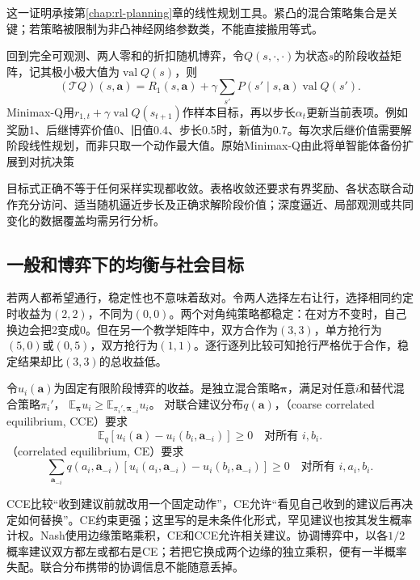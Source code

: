 这一证明承接第\ref{chap:rl-planning}章的线性规划工具。紧凸的混合策略集合是关键；若策略被限制为非凸神经网络参数类，不能直接搬用等式。

回到完全可观测、两人零和的折扣随机博弈，令$Q(s,\cdot,\cdot)$为状态$s$的阶段收益矩阵，记其极小极大值为$\operatorname{val}Q(s)$，则
\begin{equation}
 (\mathcal T Q)(s,\bm a)
 =R_1(s,\bm a)+\gamma\sum_{s'}P(s'\mid s,\bm a)
           \operatorname{val}Q(s').
 \label{eq:rl-multi-agent-minimax-backup}
\end{equation}
Minimax-Q用$r_{1,t}+\gamma\operatorname{val}Q(s_{t+1})$作样本目标，再以步长$\alpha_t$更新当前表项。例如奖励1、后继博弈价值0、旧值0.4、步长0.5时，新值为0.7。每次求后继价值需要解阶段线性规划，而非只取一个动作最大值。原始Minimax-Q由此将单智能体备份扩展到对抗决策

目标式正确不等于任何采样实现都收敛。表格收敛还要求有界奖励、各状态联合动作充分访问、适当随机逼近步长及正确求解阶段价值；深度逼近、局部观测或共同变化的数据覆盖均需另行分析。

\subsection{一般和博弈下的均衡与社会目标}
\label{sec:rl-multi-agent-equilibria}

若两人都希望通行，稳定性也不意味着敌对。令两人选择左右让行，选择相同约定时收益为$(2,2)$，不同为$(0,0)$。两个对角纯策略都稳定：在对方不变时，自己换边会把2变成0。但在另一个教学矩阵中，双方合作为$(3,3)$，单方抢行为$(5,0)$或$(0,5)$，双方抢行为$(1,1)$。逐行逐列比较可知抢行严格优于合作，稳定结果却比$(3,3)$的总收益低。

\begin{definition}[有限阶段博弈的偏离标准]
\label{def:rl-multi-agent-equilibria}
令$u_i(\bm a)$为固定有限阶段博弈的收益。是独立混合策略$\bm\pi$，满足对任意$i$和替代混合策略$\pi_i'$，
$\mathbb E_{\bm\pi}u_i\geq\mathbb E_{\pi_i',\bm\pi_{-i}}u_i$。
对联合建议分布$q(\bm a)$，（coarse correlated equilibrium, CCE）要求
\[
 \mathbb E_q[u_i(\bm a)-u_i(b_i,\bm a_{-i})]\geq0
 \quad\text{对所有 }i,b_i.
\]
（correlated equilibrium, CE）要求
\[
 \sum_{\bm a_{-i}}q(a_i,\bm a_{-i})
 [u_i(a_i,\bm a_{-i})-u_i(b_i,\bm a_{-i})]\geq0
 \quad\text{对所有 }i,a_i,b_i.
\]
\end{definition}

CCE比较“收到建议前就改用一个固定动作”，CE允许“看见自己收到的建议后再决定如何替换”。CE约束更强；这里写的是未条件化形式，罕见建议也按其发生概率计权。Nash使用边缘策略乘积，CE和CCE允许相关建议。协调博弈中，以各$1/2$概率建议双方都左或都右是CE；若把它换成两个边缘的独立乘积，便有一半概率失配。联合分布携带的协调信息不能随意丢掉。

